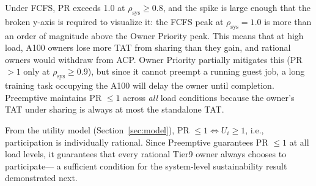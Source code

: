 
Under FCFS, PR exceeds 1.0 at $\rho_\mathrm{sys} \geq 0.8$,
and the spike is large enough that the broken y-axis is required to visualize it:
the FCFS peak at $\rho_\mathrm{sys} = 1.0$ is more than an order of magnitude
above the Owner Priority peak.
This means that at high load, A100 owners lose more TAT from sharing
than they gain, and rational owners would withdraw from ACP.
Owner Priority partially mitigates this (PR $> 1$ only at $\rho_\mathrm{sys} \geq 0.9$),
but since it cannot preempt a running guest job, a long training task
occupying the A100 will delay the owner until completion.
Preemptive maintains PR $\leq 1$ across \emph{all} load conditions
because the owner's TAT under sharing is always at most the standalone TAT.


From the utility model (Section~\ref{sec:model}),
PR $\leq 1 \Leftrightarrow U_i \geq 1$, i.e., participation is individually rational.
Since Preemptive guarantees PR $\leq 1$ at all load levels,
it guarantees that every rational Tier9 owner always chooses to participate---
a sufficient condition for the system-level sustainability result demonstrated next.


